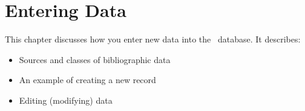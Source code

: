 
\chapter{Entering Data}
\label{cha:rgnew}

This chapter discusses how you enter new data into the \Pyb\ database.
It describes:
\begin{itemize}
\item Sources and classes of bibliographic data
\item An example of creating a new record
\item Editing (modifying) data 
\end{itemize}






